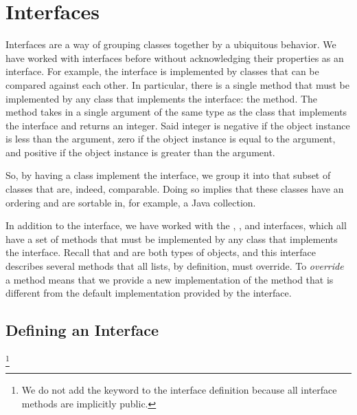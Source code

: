 \section{Interfaces}

Interfaces are a way of grouping classes together by a ubiquitous behavior. We have worked with interfaces before without acknowledging their properties as an interface. For example, the  interface is implemented by classes that can be compared against each other. In particular, there is a single method that must be implemented by any class that implements the  interface: the  method. The  method takes in a single argument of the same type as the class that implements the  interface and returns an integer. Said integer is negative if the object instance is less than the argument, zero if the object instance is equal to the argument, and positive if the object instance is greater than the argument.

So, by having a class implement the  interface, we group it into that subset of classes that are, indeed, comparable. Doing so implies that these classes have an ordering and are sortable in, for example, a Java collection. 

In addition to the  interface, we have worked with the , , and  interfaces, which all have a set of methods that must be implemented by any class that implements the interface. Recall that  and  are both types of  objects, and this interface describes several methods that all lists, by definition, must override. To \textit{override} a method means that we provide a new implementation of the method that is different from the default implementation provided by the interface.

\subsection*{Defining an Interface}

\footnote{We do not add the  keyword to the interface definition because all interface methods are implicitly public.}

